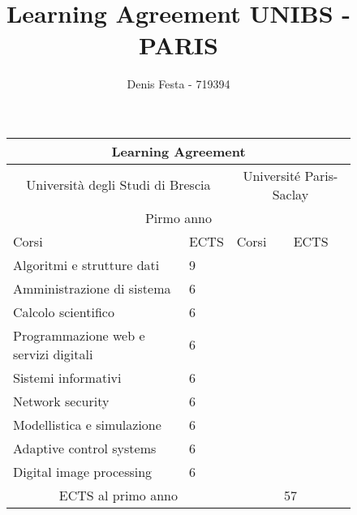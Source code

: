 \documentclass{article}
\title{Learning Agreement UNIBS - PARIS}
\author{Denis Festa - 719394}
\begin{document}
\thispagestyle{empty}

\begin{figure}
    \begin{adjustwidth}{-0.75cm}{}
        \def\arraystretch{1.1}
        \begin{tabular}{|m{5cm}|m{1cm}|m{5cm}|m{1cm}| }
            \hline 
            \multicolumn{4}{|c|}{Learning Agreement} \\
            \hline 
            
            \multicolumn{2}{|c|}{Università degli Studi di Brescia} &
                \multicolumn{2}{c|}{Université Paris-Saclay} \\
            \hline
            
            \multicolumn{4}{|c|}{Pirmo anno} \\
            \hline
            
            Corsi & ECTS & Corsi & ECTS \\
            \hline
            
            Algoritmi e strutture dati & 9 & \multicolumn{2}{c|}{ } \\\cline{1-2}
            Amministrazione di sistema & 6 & \multicolumn{2}{c|}{ } \\\cline{1-2}
            Calcolo scientifico & 6 & \multicolumn{2}{c|}{ } \\\cline{1-2}
            Programmazione web e servizi digitali & 6 & \multicolumn{2}{c|}{ } \\\cline{1-2}
            Sistemi informativi & 6 & \multicolumn{2}{c|}{ } \\\cline{1-2}
            Network security & 6 & \multicolumn{2}{c|}{ } \\\cline{1-2}
            Modellistica e simulazione & 6 & \multicolumn{2}{c|}{ } \\\cline{1-2}
            Adaptive control systems & 6 & \multicolumn{2}{c|}{ } \\\cline{1-2}
            Digital image processing & 6 & \multicolumn{2}{c|}{ } \\
            \hline
            
            \multicolumn{2}{|c}{ECTS al primo anno} & \multicolumn{2}{c|}{57} \\
            \hline
            

\end{tabular}
\end{adjustwidth}
\end{figure}
\end{document}
